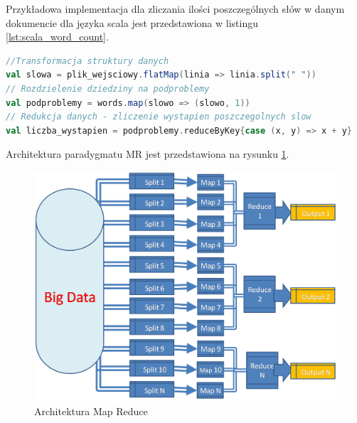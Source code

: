 \newline Przykładowa implementacja dla zliczania ilości poszczególnych słów w danym dokumencie dla języka scala jest przedstawiona w listingu \ref{lst:scala_word_count}.
\begin{lstlisting}[language=scala, caption={Przykład "Word Count"},captionpos=b, label={lst:scala_word_count}]
//Transformacja struktury danych
val slowa = plik_wejsciowy.flatMap(linia => linia.split(" "))
// Rozdzielenie dziedziny na podproblemy
val podproblemy = words.map(slowo => (slowo, 1))
// Redukcja danych - zliczenie wystapien poszczegolnych slow
val liczba_wystapien = podproblemy.reduceByKey{case (x, y) => x + y}
\end{lstlisting}
Architektura paradygmatu MR jest przedstawiona na rysunku \ref{fig:@=map_reduce_schema}.\cite{map_reduce_figure} 
\begin{figure}
	\centering
	\includegraphics[scale=0.3]{map_reduce_flow.png}
	\caption{Architektura Map Reduce}
	\label{fig:@=map_reduce_schema}
\end{figure}
